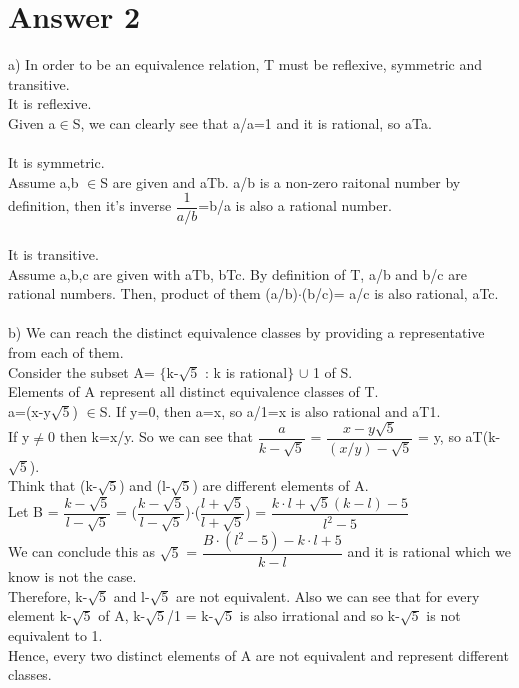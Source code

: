 \documentclass[12pt]{article}
\begin{document}
\section*{Answer 2}
 a) In order to be an equivalence relation, T must be reflexive, symmetric and transitive. \\
 It is reflexive. \\
 Given a$\in$S, we can clearly see that a/a=1 and it is rational, so aTa. \\
 \\
 It is symmetric. \\
 Assume a,b $\in$S are given and aTb. a/b is a non-zero raitonal number by definition, then it's inverse $\dfrac{1}{a/b}$=b/a is also a rational number. \\
 \\
 It is transitive. \\
 Assume a,b,c are given with aTb, bTc. By definition of T, a/b and b/c are rational numbers. Then, product of them (a/b)$\cdot$(b/c)= a/c is also rational, aTc. \\
 \\
 b) We can reach the distinct equivalence classes by providing a representative from each of them. \\
 Consider the subset A= $\lbrace$k-$\sqrt{5}$ : k is rational$\rbrace$ $\cup$ 1 of S. \\
 Elements of A represent all distinct equivalence classes of T. \\
 a=(x-y$\sqrt{5}$) $\in$S. If y=0, then a=x, so a/1=x is also rational and aT1. \\
 If y$\neq$0 then k=x/y. So we can see that  $\dfrac{a}{k-\sqrt{5}}$ = $\dfrac{x-y\sqrt{5}}{(x/y)-\sqrt{5}}$ = y, so aT(k-$\sqrt{5}$). \\
 Think that (k-$\sqrt{5}$) and (l-$\sqrt{5}$) are different elements of A. \\
 Let B = $\dfrac{k-\sqrt{5}}{l-\sqrt{5}}$ = ($\dfrac{k-\sqrt{5}}{l-\sqrt{5}}$)$\cdot$($\dfrac{l+\sqrt{5}}{l+\sqrt{5}}$) = $\dfrac{k \cdot l + \sqrt{5}(k-l)-5}{l^2-5}$ \\
 We can conclude this as $\sqrt{5}$ = $\dfrac{B \cdot (l^2-5) - k \cdot l + 5}{k-l}$ and it is rational which we know is not the case.\\
 Therefore, k-$\sqrt{5}$ and l-$\sqrt{5}$ are not equivalent. Also we can see that for every element k-$\sqrt{5}$ of A, k-$\sqrt{5}$/1 = k-$\sqrt{5}$ is also irrational and so k-$\sqrt{5}$ is not equivalent to 1. \\
 Hence, every two distinct elements of A are not equivalent and represent different classes. \\
 
\end{document}
